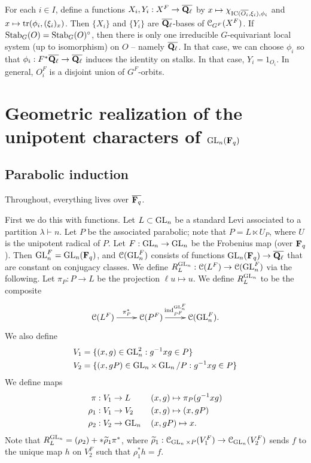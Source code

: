 \documentclass{article}
\begin{document}
For each $i\in I$, define a functions $X_i,Y_i:X^F \to \overline{\mathbf{Q}_\ell}$ by 
$x\mapsto \chi_{\operatorname{IC}(\overline{O_i},\xi_i),\phi_i}$ and
$x\mapsto \operatorname{tr}(\phi_i,(\xi_i)_x)$. Then 
$\{X_i\}$ and $\{Y_i\}$ are $\overline{\mathbf{Q}_\ell}$-bases of $\mathcal{C}_{G^F}(X^F)$. 
If $\operatorname{Stab}_G(O)=\operatorname{Stab}_G(O)^\circ$, then there is only one irreducible 
$G$-equivariant local system (up to isomorphism) on $O$ -- namely 
$\overline{\mathbf{Q}_\ell}$. In that case, we can choose $\phi_i$ so that 
$\phi_i:F^\ast \overline{\mathbf{Q}_\ell}\to \overline{\mathbf{Q}_\ell}$ induces the identity 
on stalks. In that case, $Y_i=1_{O_i}$. In general, 
$O_i^F$ is a disjoint union of $G^F$-orbits. 





\section{Geometric realization of the unipotent characters of \texorpdfstring{$\operatorname{GL}_n(\mathbf{F}_q)$}{GLnFq}}


\subsection{Parabolic induction}

Throughout, everything lives over $\overline{\mathbf{F}_q}$. 

First we do this with functions. Let $L\subset \operatorname{GL}_n$ be a 
standard Levi associated to a partition $\lambda\vdash n$. Let $P$ 
be the associated parabolic; note that $P=L\ltimes U_P$, where 
$U$ is the unipotent radical of $P$. Let 
$F:\operatorname{GL}_n \to \operatorname{GL}_n$ be the Frobenius map (over 
$\mathbf{F}_q$). Then $\operatorname{GL}_n^F = \operatorname{GL}_n(\mathbf{F}_q)$, and 
$\mathcal{C}(\operatorname{GL}_n^F)$ consists of functions 
$\operatorname{GL}_n(\mathbf{F}_q) \to \overline{\mathbf{Q}_\ell}$ that are constant 
on conjugacy classes. We define 
$R_L^{\operatorname{GL}_n}:\mathcal{C}(L^F) \to \mathcal{C}(\operatorname{GL}_n^F)$ via 
the following. Let $\pi_P:P \to L$ be the projection 
$\ell u\mapsto u$. We define 
$R_L^{\operatorname{GL}_n}$ to be the composite 
\[\xymatrix{
  \cC(L^F) \ar[r]^-{\pi_P^\ast} 
    & \cC(P^F) \ar[r]^-{\induce_{P^F}^{\generallinear_n^F}} 
    & \cC(\generallinear_n^F) .
}\]
We also define 
\begin{align*}
  V_1 &= \{(x,g)\in \operatorname{GL}_n^2:g^{-1} x g\in P\} \\
  V_2 &= \{(x,g P)\in \operatorname{GL}_n\times \operatorname{GL}_n / P:g^{-1} x g\in P\} 
\end{align*}
We define maps 
\begin{align*}
  \pi:V_1 &\to L && (x,g)\mapsto \pi_P(g^{-1} x g) \\
  \rho_1:V_1 &\to V_2 && (x,g) \mapsto (x, g P) \\
  \rho_2:V_2 &\to \operatorname{GL}_n{} && (x, g P)\mapsto x .
\end{align*}
Note that $R_L^{\operatorname{GL}_n} = (\rho_2)+\ast \widetilde \rho_1 \pi^\ast$, 
where 
$\widetilde \rho_1:\mathcal{C}_{\operatorname{GL}_n\times P}(V_1^F) \to \mathcal{C}_{\operatorname{GL}_n}(V_2^F)$ 
sends $f$ to the unique map $h$ on $V_2^F$ such that 
$\rho_1^\ast h = f$. 
\end{document}

